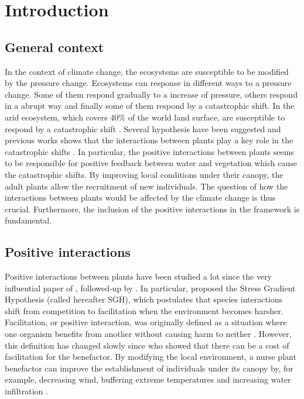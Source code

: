 \documentclass[12pt]{article} %
\begin{document}


\section{Introduction}
\subsection{General context}
In the context of climate change, the ecosystems are susceptible to be modified by the pressure change. Ecosystems can response in different ways to a pressure change. Some of them respond gradually to a increase of pressure, others respond in a abrupt way and finally some of them respond by a catastrophic shift. In the arid ecosystem, which covers 40\% of the world land surface, are susceptible to respond by a catastrophic shift \citep{Kefi2007}. Several hypothesis have been suggested and previous works shows that the interactions between plants play a key role in the catastrophic shifts \citep{Rietkerk2004,Kefi2007}. In particular, the positive interactions between plants seems to be responsible for positive feedback between water and vegetation which cause the catastrophic shifts. By improving local conditions under their canopy, the adult plants allow the recruitment of new individuals. The question of how the interactions between plants would be affected by the climate change is thus crucial. Furthermore, the inclusion of the positive interactions in the framework is fundamental.
\subsection{Positive interactions}
Positive interactions between plants have been studied a lot since the very influential paper of \citep{Bertness1994}, followed-up by \citep{Bruno2003}. In particular, \citet{Bertness1994} proposed the Stress Gradient Hypothesis (called hereafter SGH), which postulates that species interactions shift from competition to facilitation when the environment becomes harsher. Facilitation, or positive interaction, was originally defined as a situation where one organism benefits from another without causing harm to neither \citep{Bruno2003}. However, this definition has changed slowly since \citet{Schob2014} who showed that there can be a cost of facilitation for the benefactor.
By modifying the local environment, a nurse plant benefactor can improve the establishment of individuals under its canopy by, for example, decreasing wind, buffering extreme temperatures and increasing water infiltration \citep{Rietkerk1997}. 
\end{document}
